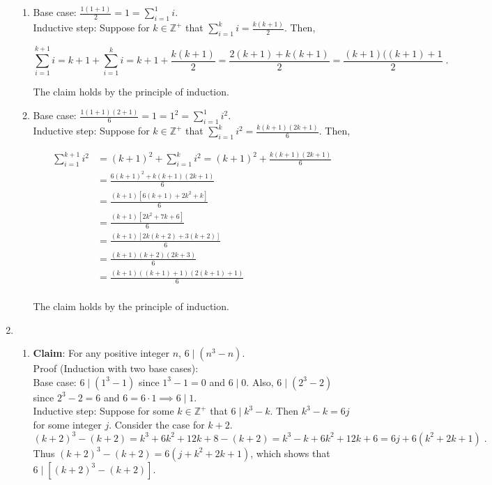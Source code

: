 \documentclass[a4paper]{article}
\begin{document}
\begin{enumerate}
\begin{enumerate}
	\item
	
	Base case: $\frac{1(1+1)}{2} = 1 = \sum_{i=1}^1 i$.\\
	Inductive step: Suppose for $k \in \mathbb{Z}^+$ that $			\sum_{i = 1}^k i = \frac{k(k+1)}{2}$. Then,
	
	$$
	\sum_{i=1}^{k+1} i
	= k+1 + \sum_{i=1}^k i
	= k+1 + \frac{k(k+1)}{2}
	= \frac{2(k+1) + k(k+1)}{2}
	= \frac{(k+1)((k+1)+1}{2} \;.
	$$
	
	The claim holds by the principle of induction.
	
	\item
	
	Base case: $\frac{1(1+1)(2+1)}{6}=1=1^2=\sum_{i=1}^1i^2$.\\
	Inductive step: Suppose for $k \in \mathbb{Z}^+$ that $			\sum_{i = 1}^k i^2 = \frac{k(k+1)(2k+1)}{6}$. Then,
	
	\begin{align*}
	\sum_{i=1}^{k+1} i^2 &= (k+1)^2 + \sum_{i=1}^k i^2
	= (k+1)^2 + \frac{k(k+1)(2k+1)}{6} \\
	&= \frac{6(k+1)^2 + k(k+1)(2k+1)}{6} \\
	&= \frac{(k+1)[6(k+1) + 2k^2 + k]}{6} \\
	&= \frac{(k+1)[2k^2 + 7k + 6]}{6} \\
	&= \frac{(k+1)[2k(k + 2) + 3(k + 2)]}{6} \\
	&= \frac{(k+1)(k+2)(2k + 3)}{6} \\
	&= \frac{(k+1)((k+1)+1)(2(k+1) + 1)}{6}\ \\
	\end{align*}
	
	The claim holds by the principle of induction.

\end{enumerate}

	
\item

\begin{enumerate}

	\item
	{\bf Claim}: For any positive integer $n$,
	$6 \mid (n^3 - n)$. \\
	Proof (Induction with two base cases): \\
	Base case: $6 \mid (1^3 - 1)$ since $1^3 - 1 = 0$ and
	$6 \mid 0$. Also, $6 \mid (2^3 - 2)$ since $2^3 - 2 = 6$
	and $6 = 6 \cdot 1 \implies 6 \mid 1$.\\
	Inductive step: Suppose for some $k \in \mathbb{Z}^+$ that
	$6 \mid k^3 - k$. Then $k^3 - k = 6j$ for some integer $j$.
	Consider the case for $k+2$. 
	$$
	(k+2)^3 - (k+2) = k^3 + 6k^2 + 12k + 8 - (k+2)
	= k^3 - k +6k^2 + 12k + 6
	= 6j + 6(k^2 + 2k + 1)\;.
	$$
	Thus $(k+2)^3 - (k+2) = 6(j + k^2 + 2k + 1)$, which shows
	that $6 \mid [(k+2)^3 - (k+2)]$. 
	

\end{enumerate}
\end{enumerate}
\end{document}
